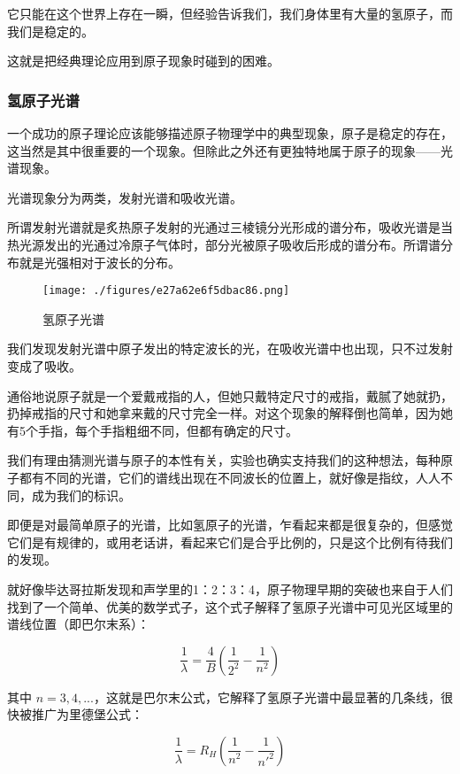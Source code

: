 它只能在这个世界上存在一瞬，但经验告诉我们，我们身体里有大量的氢原子，而我们是稳定的。

这就是把经典理论应用到原子现象时碰到的困难。

\subsubsection{氢原子光谱}


一个成功的原子理论应该能够描述原子物理学中的典型现象，原子是稳定的存在，这当然是其中很重要的一个现象。但除此之外还有更独特地属于原子的现象——光谱现象。

光谱现象分为两类，发射光谱和吸收光谱。

所谓发射光谱就是炙热原子发射的光通过三棱镜分光形成的谱分布，吸收光谱是当热光源发出的光通过冷原子气体时，部分光被原子吸收后形成的谱分布。所谓谱分布就是光强相对于波长的分布。

\begin{figure}[ht]
\centering
\texttt{[image: ./figures/e27a62e6f5dbac86.png]}
\caption{氢原子光谱} \label{fig_ClBohr_6}
\end{figure}


我们发现发射光谱中原子发出的特定波长的光，在吸收光谱中也出现，只不过发射变成了吸收。

通俗地说原子就是一个爱戴戒指的人，但她只戴特定尺寸的戒指，戴腻了她就扔，扔掉戒指的尺寸和她拿来戴的尺寸完全一样。对这个现象的解释倒也简单，因为她有5个手指，每个手指粗细不同，但都有确定的尺寸。

我们有理由猜测光谱与原子的本性有关，实验也确实支持我们的这种想法，每种原子都有不同的光谱，它们的谱线出现在不同波长的位置上，就好像是指纹，人人不同，成为我们的标识。

即便是对最简单原子的光谱，比如氢原子的光谱，乍看起来都是很复杂的，但感觉它们是有规律的，或用老话讲，看起来它们是合乎比例的，只是这个比例有待我们的发现。

就好像毕达哥拉斯发现和声学里的1：2：3：4，原子物理早期的突破也来自于人们找到了一个简单、优美的数学式子，这个式子解释了氢原子光谱中可见光区域里的谱线位置（即巴尔末系）：

\begin{equation}
\frac{1}{\lambda} = \frac{4}{B} \left( \frac{1}{2^2} - \frac{1}{n^2} \right)
\end{equation}

其中 $n = 3, 4, ...$，这就是巴尔末公式，它解释了氢原子光谱中最显著的几条线，很快被推广为里德堡公式：

\begin{equation}
\frac{1}{\lambda} = R_H \left(  \frac{1}{n^2} - \frac{1}{n'^2}  \right)
\end{equation}

